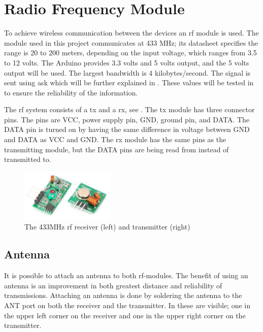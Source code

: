 \section{Radio Frequency Module} \label{rfmodule}
To achieve wireless communication between the devices an \gls{rf} module is used.
The module used in this project communicates at 433 MHz; its datasheet \cite{RFRX, RFTX} specifies the range is 20 to 200 meters, depending on the input voltage, which ranges from 3.5 to 12 volts. 
The Arduino provides 3.3 volts and 5 volts output, and the 5 volts output will be used.
The largest bandwidth is 4 kilobytes/second. 
The signal is sent using \gls{ask} which will be further explained in .
These values will be tested in  to ensure the reliability of the information. 

\bigskip \noindent
The \gls{rf} system consists of a \gls{tx} and a \gls{rx}, see .
The \gls{tx} module has three connector pins.
The pins are VCC, power supply pin, GND, ground pin, and DATA.
The DATA pin is turned on by having the same difference in voltage between GND and DATA as VCC and GND. 
The \gls{rx} module has the same pins as the transmitting module, but the DATA pins are being read from instead of transmitted to.

\begin{figure}[h] 
\vspace{-5pt} 
\centering
\includegraphics[width=0.4\textwidth]{Figures/arduino_rf.jpg}
\vspace{-5pt} 
\caption{The 433MHz \gls{rf} receiver (left) and transmitter (right)}
\label{fig:arduino_rf}
\vspace{-5pt}    
\end{figure}

\subsection{Antenna}
It is possible to attach an antenna to both \gls{rf}-modules. 
The benefit of using an antenna is an improvement in both greatest distance and reliability of transmissions.
Attaching an antenna is done by soldering the antenna to the ANT port on both the receiver and the transmitter. 
In  these are visible; one in the upper left corner on the receiver and one in the upper right corner on the transmitter. 

